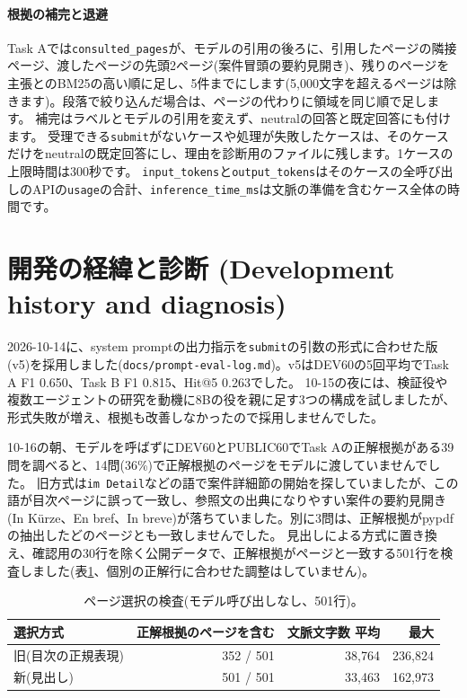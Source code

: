 \documentclass[10pt,a4paper]{ltjsarticle}
\begin{document}
\paragraph{根拠の補完と退避}
Task Aでは\texttt{consulted\_pages}が、モデルの引用の後ろに、引用したページの隣接ページ、渡したページの先頭2ページ(案件冒頭の要約見開き)、残りのページを主張とのBM25の高い順に足し、5件までにします(5,000文字を超えるページは除きます)。段落で絞り込んだ場合は、ページの代わりに領域を同じ順で足します。
補完はラベルとモデルの引用を変えず、neutralの回答と既定回答にも付けます。
受理できる\texttt{submit}がないケースや処理が失敗したケースは、そのケースだけをneutralの既定回答にし、理由を診断用のファイルに残します。1ケースの上限時間は300秒です。
\texttt{input\_tokens}と\texttt{output\_tokens}はそのケースの全呼び出しのAPIの\texttt{usage}の合計、\texttt{inference\_time\_ms}は文脈の準備を含むケース全体の時間です。

\section{開発の経緯と診断 (Development history and diagnosis)}

2026-10-14に、system promptの出力指示を\texttt{submit}の引数の形式に合わせた版(v5)を採用しました(\texttt{docs/prompt-eval-log.md})。v5はDEV60の5回平均でTask A F1 0.650、Task B F1 0.815、Hit@5 0.263でした。
10-15の夜には、検証役や複数エージェントの研究\cite{dhuliawala2023cove,huang2024selfcorrect,du2023debate,smit2024mad}を動機に8Bの役を親に足す3つの構成を試しましたが、形式失敗が増え、根拠も改善しなかったので採用しませんでした。

10-16の朝、モデルを呼ばずにDEV60とPUBLIC60でTask Aの正解根拠がある39問を調べると、14問(36\%)で正解根拠のページをモデルに渡していませんでした。
旧方式は\texttt{im Detail}などの語で案件詳細節の開始を探していましたが、この語が目次ページに誤って一致し、参照文の出典になりやすい案件の要約見開き(In Kürze、En bref、In breve)が落ちていました。別に3問は、正解根拠がpypdfの抽出したどのページとも一致しませんでした。
見出しによる方式に置き換え、確認用の30行を除く公開データで、正解根拠がページと一致する501行を検査しました(表\ref{tab:audit}、個別の正解行に合わせた調整はしていません)。

\begin{table}[t]
  \centering
  \caption{ページ選択の検査(モデル呼び出しなし、501行)。}
  \label{tab:audit}
  \small
  \begin{tabular}{lrrr}
    \toprule
    選択方式 & 正解根拠のページを含む & 文脈文字数 平均 & 最大 \\
    \midrule
    旧(目次の正規表現) & 352 / 501 & 38,764 & 236,824 \\
    新(見出し) & 501 / 501 & 33,463 & 162,973 \\
    \bottomrule
  \end{tabular}
\end{table}
\end{document}
